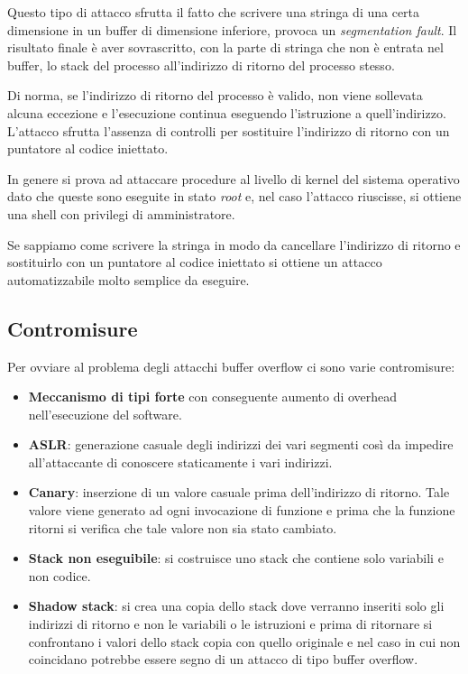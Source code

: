 Questo tipo di attacco sfrutta il fatto che scrivere una stringa di una certa dimensione in un buffer di dimensione
inferiore, provoca un \emph{segmentation fault}. Il risultato finale è aver sovrascritto, con la parte di stringa che
non è entrata nel buffer, lo stack del processo all'indirizzo di ritorno del processo stesso.

Di norma, se l'indirizzo di ritorno del processo è valido, non viene sollevata alcuna eccezione e l'esecuzione continua
eseguendo l'istruzione a quell'indirizzo. L'attacco sfrutta l'assenza di controlli per sostituire l'indirizzo di ritorno
con un puntatore al codice iniettato.

In genere si prova ad attaccare procedure al livello di kernel del sistema operativo dato che queste sono eseguite
in stato \emph{root} e, nel caso l'attacco riuscisse, si ottiene una shell con privilegi di amministratore.

Se sappiamo come scrivere la stringa in modo da cancellare l'indirizzo di ritorno e sostituirlo con un puntatore al
codice iniettato si ottiene un attacco automatizzabile molto semplice da eseguire.

\subsection{Contromisure}
Per ovviare al problema degli attacchi buffer overflow ci sono varie contromisure:
\begin{itemize}
	\item \textbf{Meccanismo di tipi forte} con conseguente aumento di overhead nell'esecuzione del software.
	\item \textbf{ASLR}: generazione casuale degli indirizzi dei vari segmenti così da impedire all'attaccante di
	      conoscere staticamente i vari indirizzi.
	\item \textbf{Canary}: inserzione di un valore casuale prima dell'indirizzo di ritorno. Tale valore viene generato
	      ad ogni invocazione di funzione e prima che la funzione ritorni si verifica che tale valore non sia stato
	      cambiato.
	\item \textbf{Stack non eseguibile}: si costruisce uno stack che contiene solo variabili e non codice.
	\item \textbf{Shadow stack}: si crea una copia dello stack dove verranno inseriti solo gli indirizzi di ritorno
	      e non le variabili o le istruzioni e prima di ritornare si confrontano i valori dello stack copia con quello
	      originale e nel caso in cui non coincidano potrebbe essere segno di un attacco di tipo buffer overflow.
\end{itemize}

